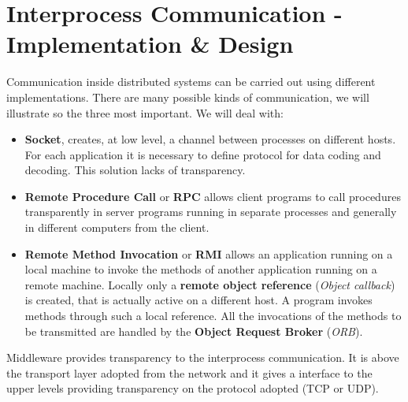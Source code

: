 \documentclass[11pt,a4paper]{article}
\begin{document}
\section{Interprocess Communication - Implementation \& Design}
Communication inside distributed systems can be carried out using different implementations. There are many possible kinds of communication, we will illustrate so the three most important. We will deal with:
\begin{itemize}
	\item \textbf{Socket}, creates, at low level, a channel between processes on different hosts. For each application it is necessary to define protocol for data coding and decoding. This solution lacks of transparency.
	\item \textbf{Remote Procedure Call} or \textbf{RPC} allows client programs to call procedures transparently in server programs running in separate processes and generally in different computers from the client.
	\item \textbf{Remote Method Invocation} or \textbf{RMI}  allows an application running on a local machine to invoke the methods of another application running on a remote machine. Locally only a \textbf{remote object reference} (\textit{Object callback}) is created, that is actually active on a different host. A program invokes methods through such a local reference. All the invocations of the methods to be transmitted are handled by the \textbf{Object Request Broker} (\textit{ORB}).
\end{itemize}
Middleware provides transparency to the interprocess communication. It is above the transport layer adopted from the network and it gives a interface to the upper levels providing transparency on the protocol adopted (TCP or UDP).
\end{document}
